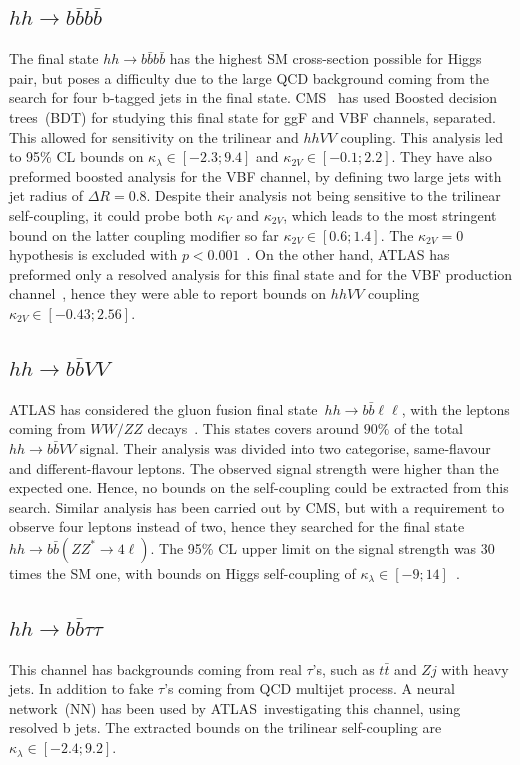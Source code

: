 \subsection*{$hh \to b\bar b b \bar b $}
 The final state $ hh \to b\bar b b \bar b$ has the highest SM cross-section possible for Higgs pair, but poses a difficulty due to the large QCD background  coming from the search for four b-tagged jets in the final state. CMS~\cite{CMS-PAS-HIG-20-005} has used Boosted decision trees~(BDT) for studying this final state for ggF and VBF channels, separated. This allowed for sensitivity on the trilinear and $hhVV$ coupling. This analysis led to 95\% CL bounds on $\kappa_\lambda \in [-2.3;9.4]$ and $\kappa_{2V} \in [-0.1; 2.2]$.  They have also preformed boosted analysis for the VBF channel, by defining two large jets with jet radius of $\Delta R =0.8$. Despite their analysis not being sensitive to the trilinear self-coupling, it could probe both $\kappa_V$ and  $\kappa_{2V} $, which leads to the most stringent bound on the latter coupling modifier so far  $\kappa_{2V}  \in [0.6;1.4]$. The $\kappa_{2V}=0$ hypothesis is excluded with $ p<0.001$~\cite{CMS-PAS-B2G-21-001}. On the other hand, ATLAS has preformed only a resolved analysis for this final state and for the VBF production channel~\cite{ATLAS:2020jgy}, hence they were able to report bounds on $hhVV$ coupling $\kappa_{2V} \in [-0.43;2.56]$. 
\subsection*{$hh \to b\bar b VV $}
ATLAS has considered the gluon fusion final state~$hh \to b\bar b \ell \ell$, with the leptons coming from $WW/ZZ$ decays~\cite{ATLAS:2019vwv}. This states covers around $90\%$ of the total~$hh \to b\bar b VV $ signal. Their analysis was divided into two categorise, same-flavour and different-flavour leptons. The observed signal strength were higher than the expected one. Hence, no bounds on the self-coupling could be extracted from this search. Similar analysis has been carried out by CMS, but with a requirement to observe four leptons instead of two, hence they searched for the final state $hh \to b\bar b( ZZ^*\to 4\ell)$. The 95\% CL upper limit on the signal strength was 30 times the SM one, with bounds on Higgs self-coupling of $\kappa_\lambda \in [-9;14]$~\cite{CMS-PAS-HIG-20-004}. 
\subsection*{$hh \to b\bar b \tau \tau $}
This channel has backgrounds coming from real $\tau$'s, such as $t\bar t$ and $Z j$ with heavy jets. In addition to fake $\tau$'s coming from QCD multijet process. A neural network~(NN) has been used by ATLAS~\cite{ATLAS-CONF-2021-052}investigating this channel, using resolved b jets. The extracted bounds on the trilinear self-coupling are $\kappa_\lambda \in [-2.4;9.2]$. 
